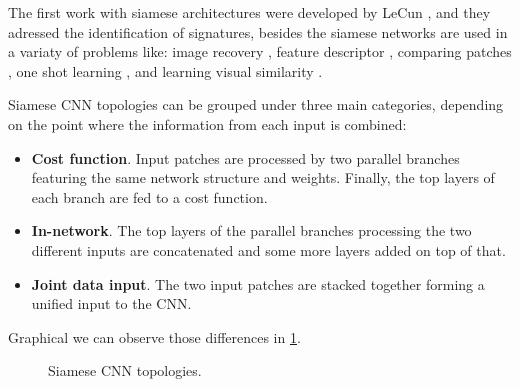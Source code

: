 \documentclass[12pt, a4paper, titlepage,twoside,openright]{article}
\begin{document}
The first work with siamese architectures were developed by LeCun \cite{siamLecun}, \cite{siameLecun2} and they adressed the identification of signatures, besides the siamese networks are used in a variaty of problems like: image recovery \cite{siameseQuer}, feature descriptor \cite{siameDescri}, comparing patches \cite{patch1}, one shot learning \cite{siameseOne}, and learning visual similarity \cite{siamesSImi}. 

Siamese CNN topologies can be grouped under three main categories, depending on the point where the information from each input is combined:

\begin{itemize}

\item \textbf{Cost function}. Input patches are processed by two parallel branches featuring the same network structure and weights. Finally, the top layers of each branch are fed to a cost function.

\item \textbf{In-network}. The top layers of the parallel branches processing the two different inputs are concatenated and some more layers added on top of that.

\item \textbf{Joint data input}. The two input patches are stacked together forming a unified input to the CNN.

\end{itemize}

Graphical we can observe those differences in \ref{siamese2Data1}.
\begin{figure}[H]
		
\centering


\caption{Siamese CNN topologies.}
\label{siamese2Data1}
\end{figure}
\end{document}
